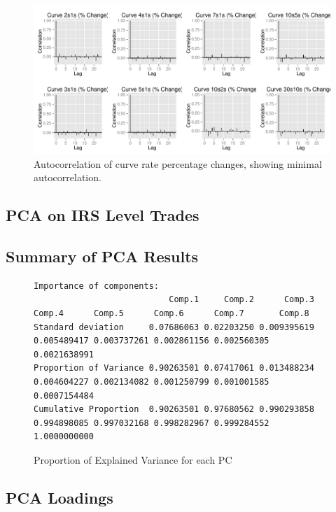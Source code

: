 \begin{figure}[H]
\centering\includegraphics[width=\textwidth]{acf-curve-returns.pdf}
\caption{Autocorrelation of curve rate percentage changes, showing minimal autocorrelation.}
\label{fig:acf-curve-returns}
\end{figure}

\begin{landscape}
\chapter{PCA on IRS Level Trades}
\section{Summary of PCA Results}

\begin{figure}[H]
\begin{lstlisting}
Importance of components:
                           Comp.1     Comp.2      Comp.3      Comp.4      Comp.5      Comp.6      Comp.7       Comp.8
Standard deviation     0.07686063 0.02203250 0.009395619 0.005489417 0.003737261 0.002861156 0.002560305 0.0021638991
Proportion of Variance 0.90263501 0.07417061 0.013488234 0.004604227 0.002134082 0.001250799 0.001001585 0.0007154484
Cumulative Proportion  0.90263501 0.97680562 0.990293858 0.994898085 0.997032168 0.998282967 0.999284552 1.0000000000
\end{lstlisting}
\caption{Proportion of Explained Variance for each PC}
\label{fig:verbatim-vanilla}
\end{figure}

\end{landscape}

\section{PCA Loadings}

